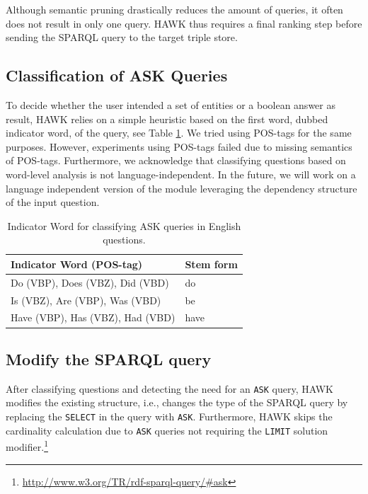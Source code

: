 Although semantic pruning drastically reduces the amount of queries, it often does not result in only one query. HAWK thus requires a final ranking step before sending the SPARQL query to the target triple store.


\subsection{Classification of ASK Queries}
To decide whether the user intended a set of entities or a boolean answer as result, HAWK relies on a simple heuristic based on the first word, dubbed indicator word, of the query, see Table \ref{tab:indicator_words}. 
We tried using POS-tags for the same purposes. However, experiments using POS-tags failed due to missing semantics of POS-tags. 
Furthermore, we acknowledge that classifying questions based on word-level analysis is not language-independent. 
In the future, we will work on a language independent version of the module leveraging the dependency structure of the input question. 

\begin{table}[htb!]
\centering
\begin{tabular}{@{}ll@{}}
\toprule
\textbf{Indicator Word (POS-tag)} & \textbf{Stem form}\\ \midrule
Do (VBP), Does (VBZ), Did (VBD) & do      \\
Is (VBZ), Are (VBP), Was (VBD)  & be        \\
Have (VBP), Has (VBZ), Had (VBD)& have     \\
 \bottomrule
\end{tabular}
\caption{Indicator Word for classifying ASK queries in English questions.}
\label{tab:indicator_words}
\end{table} 

\subsection{Modify the SPARQL query}
After classifying questions  and detecting the need for an \texttt{ASK} query, HAWK modifies the existing structure, i.e., changes the type of the SPARQL query by replacing the \texttt{SELECT} in the query with \texttt{ASK}.
Furthermore, HAWK skips the cardinality calculation due to \texttt{ASK} queries not requiring the \texttt{LIMIT} solution modifier.\footnote{\url{http://www.w3.org/TR/rdf-sparql-query/\#ask}} 


